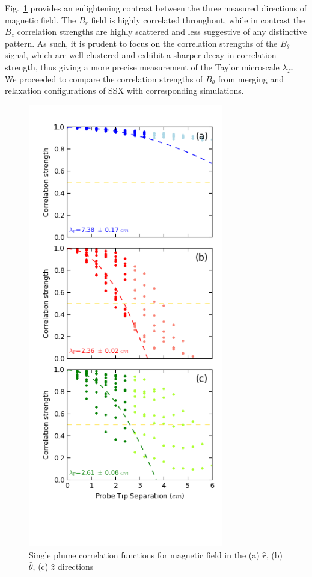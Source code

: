 \documentclass[aip,prl,amsmath,amssymb,reprint,superscriptaddress]{revtex4-1} %
\begin{document}
Fig.\ \ref{fig:brbtbz} provides an enlightening contrast between the three measured directions of magnetic field. The $B_r$ field is highly correlated throughout, while in contrast the $B_z$ correlation strengths are highly scattered and less suggestive of any distinctive pattern. As such, it is prudent to focus on the correlation strengths of the $B_\theta$ signal, which are well-clustered and exhibit a sharper decay in correlation strength, thus giving a more precise measurement of the Taylor microscale $\lambda_T$. We proceeded to compare the correlation strengths of $B_\theta$ from merging and relaxation configurations of SSX with corresponding simulations. 

\begin{figure}[!htbp]
\centerline{
\includegraphics[width=8.5cm]{Images/brbtbz-081413.png}}
\caption{Single plume correlation functions for magnetic field in the (a) $\hat{r}$, (b) $\hat{\theta}$, (c) $\hat{z}$ directions}
\label{fig:brbtbz}
\end{figure}
\end{document}
